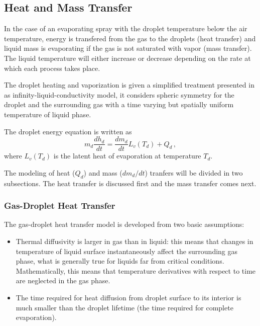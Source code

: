 \subsection{Heat and Mass Transfer}

In the case of an evaporating spray with the droplet temperature below the air temperature,
 energy is transfered from the gas to the droplets (heat transfer) and liquid mass is evaporating if the gas is not saturated with vapor (mass transfer). The liquid temperature will either increase or decrease depending on the rate at which each process takes place.

The droplet heating and vaporization is given a simplified treatment presented in \cite{sirignano} as infinity-liquid-conductivity model, it considers spheric symmetry for the droplet and the surrounding gas with a time varying but spatially uniform temperature of liquid phase. 

The droplet energy equation is written as
\begin{equation}\label{eq: drop_energy}
 m_d \frac{dh_d}{dt} = \frac{d m_d}{dt} L_v \left(T_d\right)+Q_d \, ,
\end{equation}
where $L_v\left( T_d\right)$ is the latent heat of evaporation at temperature $T_d$.

The modeling of heat ($Q_d$) and mass ($dm_d/dt$) tranfers  will be divided in two subsections. The heat transfer is discussed first and the mass transfer comes next.

\subsubsection{Gas-Droplet Heat Transfer}

The gas-droplet heat transfer model is developed from two basic assumptions:
\begin{itemize}
 \item Thermal diffusivity is larger in gas than in liquid: this means that changes in temperature of liquid surface instantaneously affect the surrounding gas phase, what is generally true for liquids far from critical conditions. Mathematically, this means that temperature derivatives with respect to time are neglected in the gas phase.
 \item The time required for heat diffusion from droplet surface to its interior is much smaller than the droplet lifetime (the time required for complete evaporation). 
\end{itemize}

